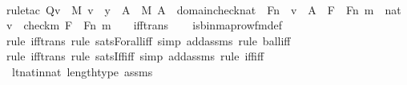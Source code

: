 \begin{isabellebody}
%
\isadelimproof
\isanewline
\ \ %
\endisadelimproof
%
\isatagproof
{}\isamarkupfalse%
{\isacharparenleft}{\kern0pt}rule{\isacharunderscore}{\kern0pt}tac\ Q{\isacharequal}{\kern0pt}{\isachardoublequoteopen}{\isasymforall}v\ {\isasymin}\ M{\isachardot}{\kern0pt}\ v\ {\isasymin}\ y\ {\isasymlongleftrightarrow}\ {\isacharparenleft}{\kern0pt}{\isacharparenleft}{\kern0pt}{\isasymexists}A\ {\isasymin}\ M{\isachardot}{\kern0pt}\ A\ {\isacharequal}{\kern0pt}\ domain{\isacharparenleft}{\kern0pt}check{\isacharparenleft}{\kern0pt}nat{\isacharparenright}{\kern0pt}{\isacharparenright}{\kern0pt}\ {\isasymtimes}\ Fn\ {\isasymand}\ v\ {\isasymin}\ A{\isacharparenright}{\kern0pt}\ {\isasymand}\ {\isacharparenleft}{\kern0pt}{\isasymexists}F\ {\isasymin}\ Fn{\isachardot}{\kern0pt}\ {\isasymexists}m\ {\isasymin}\ nat{\isachardot}{\kern0pt}\ v\ {\isacharequal}{\kern0pt}\ {\isacharless}{\kern0pt}check{\isacharparenleft}{\kern0pt}m{\isacharparenright}{\kern0pt}{\isacharcomma}{\kern0pt}\ F{\isachargreater}{\kern0pt}\ {\isasymand}\ F{\isacharbackquote}{\kern0pt}{\isacharless}{\kern0pt}n{\isacharcomma}{\kern0pt}\ m{\isachargreater}{\kern0pt}\ {\isacharequal}{\kern0pt}\ {}{\isacharparenright}{\kern0pt}{\isacharparenright}{\kern0pt}{\isachardoublequoteclose}\ \ iff{\isacharunderscore}{\kern0pt}trans{\isacharparenright}{\kern0pt}\isanewline
\ \ \isamarkupfalse%
\ is{\isacharunderscore}{\kern0pt}binmap{\isacharunderscore}{\kern0pt}row{\isacharprime}{\kern0pt}{\isacharunderscore}{\kern0pt}fm{\isacharunderscore}{\kern0pt}def\isanewline
\ \ \ \isamarkupfalse%
{\isacharparenleft}{\kern0pt}rule\ iff{\isacharunderscore}{\kern0pt}trans{\isacharcomma}{\kern0pt}\ rule\ sats{\isacharunderscore}{\kern0pt}Forall{\isacharunderscore}{\kern0pt}iff{\isacharcomma}{\kern0pt}\ simp\ add{\isacharcolon}{\kern0pt}assms{\isacharcomma}{\kern0pt}\ rule\ ball{\isacharunderscore}{\kern0pt}iff{\isacharparenright}{\kern0pt}\isanewline
\ \ \ \isamarkupfalse%
{\isacharparenleft}{\kern0pt}rule\ iff{\isacharunderscore}{\kern0pt}trans{\isacharcomma}{\kern0pt}\ rule\ sats{\isacharunderscore}{\kern0pt}Iff{\isacharunderscore}{\kern0pt}iff{\isacharcomma}{\kern0pt}\ simp\ add{\isacharcolon}{\kern0pt}assms{\isacharcomma}{\kern0pt}\ rule\ iff{\isacharunderscore}{\kern0pt}iff{\isacharparenright}{\kern0pt}\isanewline
\ \ \isamarkupfalse%
\ lt{\isacharunderscore}{\kern0pt}nat{\isacharunderscore}{\kern0pt}in{\isacharunderscore}{\kern0pt}nat\ length{\isacharunderscore}{\kern0pt}type\ assms\isanewline
\ \ \ \ \isamarkupfalse%

\end{isabellebody}
